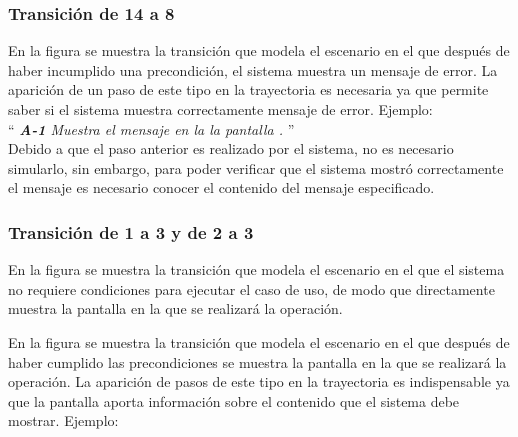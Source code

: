 
\subsubsection{Transición de 14 a 8}
  
En la figura  se muestra la transición que modela el escenario en el que después de haber incumplido una precondición, el sistema muestra un mensaje de error. 
La aparición de un paso de este tipo en la trayectoria es necesaria ya que  permite saber si el sistema muestra correctamente mensaje de error. Ejemplo:\\

``{\it
    {\bf A-1} \UCsist Muestra el mensaje  en la la pantalla .
}''\\
	
	Debido a que el paso anterior es realizado por el sistema, no es necesario simularlo, sin embargo, para poder verificar que el sistema mostró correctamente el mensaje es necesario conocer el contenido del mensaje especificado. 
		
\subsubsection{Transición de 1 a 3 y de 2 a 3}

  
En la figura  se muestra la transición que modela el escenario en el que el sistema no requiere condiciones para ejecutar el caso de uso, de modo que directamente muestra la pantalla en la que se realizará la operación.
  
 En la figura  se muestra la transición que modela el escenario en el que después de haber cumplido las precondiciones se muestra la pantalla en la que se realizará la operación.
 La aparición de pasos de este tipo en la trayectoria es indispensable ya que la pantalla aporta información sobre el contenido que el sistema debe mostrar. Ejemplo:\\
   
